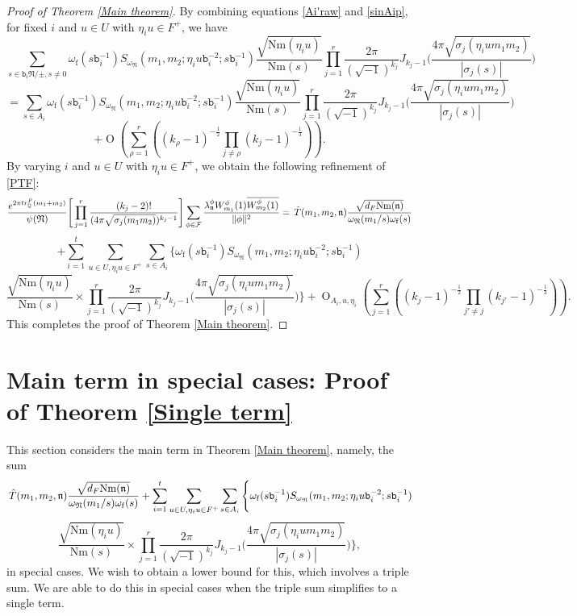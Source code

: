\documentclass[reqno]{amsart}
\theoremstyle{plain}
\theoremstyle{definition}
\theoremstyle{remark}
\def\Nr{\mathrm{Nm}}
\def\b{\mathtt b}
\def\O{\operatorname{O}}
\begin{document}
\begin{proof}[Proof of Theorem \ref{Main theorem}]
By combining equations \eqref{Ai'raw} and \eqref{sinAip}, for fixed $i$ and $u\in U$  with $\eta_i u\in F^+$, we have 
 $$ 
\sum_{s\in  \mathfrak{\mathtt{b}_i} \mathfrak{N}/\pm, s\neq 0 }\omega_{\mathrm{f}}(s \mathtt{b}_i^{-1} ) S_{\omega_\mathfrak{N}} (m_1,m_2;\eta_i u \mathtt{b}_i^{-2};s\mathtt{b}_i^{-1})
 \frac{\sqrt{\Nr(\eta_i u)}}{\Nr(s)}
 \prod_{j=1}^r\frac{2\pi}{(\sqrt{-1})^{k_j}}J_{k_j-1} \Big(  \frac{4 \pi\sqrt{\sigma_j (\eta_i u m_1m_2 )}}{|\sigma_j(s)|}\Big) 
    $$
  $$ 
= \sum_{s\in A_i }\omega_{\mathrm{f}}(s \mathtt{b}_i^{-1} ) S_{\omega_\mathfrak{N}} (m_1,m_2;\eta_i u \mathtt{b}_i^{-2};s\mathtt{b}_i^{-1})
 \frac{\sqrt{\Nr(\eta_i u)}}{\Nr(s)}   
 \prod_{j=1}^r\frac{2\pi}{(\sqrt{-1})^{k_j}}J_{k_j-1} \Big(  \frac{4 \pi\sqrt{\sigma_j (\eta_i u m_1m_2 )}}{|\sigma_j(s)|}\Big)
$$
$$
+\O \left( \sum_{\rho=1}^r \left( (k_{\rho}-1)^{-\frac{1}{2}}\prod_{j\neq \rho}(k_{j}-1)^{-\frac{1}{3}}\right)\right) . 
$$    
By varying $i$ and $u\in U$ with $\eta_i u\in F^+$, we obtain the following refinement of \eqref{PTF}:
$$ \frac{e^{2\pi tr_{\mathbb{Q}}^F (m_1+m_2)}}{{\psi(\mathfrak{N})}}\Bigg[\prod_{j=1}^r  \frac{(k_j-2)!}{(4\pi \sqrt{\sigma_j(m_1m_2)})^{k_j-1}}\Bigg]
\sum_{{\phi}\in \mathcal{F} }\frac{\lambda_\mathfrak{n}^\phi W_{m_1}^\phi(1) \overline{W_{m_2}^\phi(1)}}{\|\phi\|^2}
=\, \Hat{T}(m_1,m_2,\mathfrak{n})\frac{\sqrt{d_F\Nr(\mathfrak{n})}}{\omega_\mathfrak{N}(m_1/s)\omega_{\mathrm{f}}(s)}
 $$   
  $$ 
+\sum_{i=1}^t \sum_{u\in U, \eta_i u\in F^+}\sum_{s\in A_i }\Bigg\{ \omega_{\mathrm{f}}(s\mathtt{b}_i^{-1} ) S_{\omega_\mathfrak{N}} (m_1,m_2;\eta_i u \b_i^{-2};s\b_i^{-1})
 $$
 $$ 
\frac{\sqrt{\Nr(\eta_i u)}}{\Nr(s)}\times \prod_{j=1}^r\frac{2\pi}{(\sqrt{-1})^{k_j}}J_{k_j-1} \Big(  \frac{4 \pi\sqrt{\sigma_j (\eta_i u m_1m_2 )}}{|\sigma_j(s)|}\Big)
 \Bigg\}+
\O_{A_i,u,\eta_i} \left(\sum_{j=1}^r \left( (k_{j}-1)^{-\frac{1}{2}}\prod_{j'\neq j}(k_{j'}-1)^{-\frac{1}{3}}\right)\right).
$$
This completes the proof of Theorem \ref{Main theorem}. 
\end{proof}
\bigskip




\section{Main term in special cases: Proof of Theorem \ref{Single term}}\label{sec: special-cases}

This section considers the main term in Theorem \ref{Main theorem}, namely, the sum 
$$
\, \Hat{T}(m_1,m_2,\mathfrak{n})\frac{\sqrt{d_F\Nr(\mathfrak{n})}}{\omega_\mathfrak{N}(m_1/s)\omega_{\mathrm{f}}(s)}
+\sum_{i=1}^t \sum_{u\in U, \eta_i u\in F^+}\sum_{s\in A_i }\Bigg\{ \omega_{\mathrm{f}}(s\b_i^{-1} ) S_{\omega_\mathfrak{N}} (m_1,m_2;\eta_i u \b_i^{-2};s\b_i^{-1})
 $$
 $$ 
\frac{\sqrt{\Nr(\eta_i u)}}{\Nr(s)}\times \prod_{j=1}^r\frac{2\pi}{(\sqrt{-1})^{k_j}}J_{k_j-1} \Big(  \frac{4 \pi\sqrt{\sigma_j (\eta_i u m_1m_2 )}}{|\sigma_j(s)|}\Big)
 \Bigg\}, 
 $$ 
 in special cases.  We wish to obtain a lower bound for this, which involves a triple sum. We are able to do this in special cases when the triple sum simplifies to a single term.  
\end{document}
